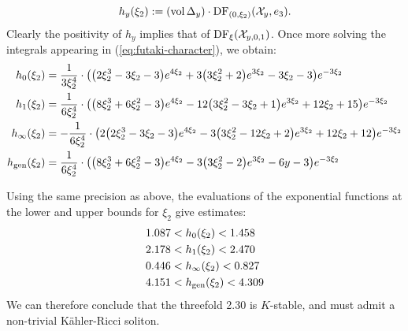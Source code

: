 \begin{example}
\[
h_y(\xi_2) := (\mathop{\rm vol}\nolimits \Delta_y) \cdot \mathop{\rm DF}\nolimits_{(0,\xi_2)}({\mathcal{X}}_{y},e_3).
\]
Clearly the positivity of \(h_y\) implies that of \(\mathop{\rm DF}\nolimits_\xi({\mathcal{X}}_{y,0,1})\). 
Once more solving the integrals appearing in (\ref{eq:futaki-character}), we obtain:
\begin{align*}
h_0(\xi_2) &= \frac{1}{3\xi_2^{4}}\cdot
{\left({\left(2   \xi_2^{3} - 3   \xi_2 - 3\right)} e^{4   \xi_2} + 3   {\left(3   \xi_2^{2} + 2\right)} e^{3   \xi_2} - 3   \xi_2 - 3\right)} e^{-3   \xi_2}
\\
h_1(\xi_2) &= \frac{1}{6   \xi_2^{4}}\cdot
{\left({\left(8   \xi_2^{3} + 6   \xi_2^{2} - 3\right)} e^{4   \xi_2} - 12   {\left(3   \xi_2^{2} - 3   \xi_2 + 1\right)} e^{3   \xi_2} + 12   \xi_2 + 15\right)} e^{-3   \xi_2} \\
h_\infty(\xi_2) &= -\frac{1}{6   \xi_2^{4}}\cdot
{\left(2   {\left(2   \xi_2^{3} - 3   \xi_2 - 3\right)} e^{4   \xi_2} - 3   {\left(3   \xi_2^{2} - 12   \xi_2 + 2\right)} e^{3   \xi_2} + 12   \xi_2 + 12\right)} e^{-3   \xi_2} \\
h_{\operatorname{gen}}(\xi_2) &= \frac{1}{6   \xi_2^{4}}\cdot{\left({\left(8   \xi_2^{3} + 6   \xi_2^{2} - 3\right)} e^{4   \xi_2 } - 3   {\left(3   \xi_2^{2} - 2\right)} e^{3   \xi_2} - 6   y - 3\right)} e^{-3   \xi_2} 
\end{align*}

Using the same precision as above, the  evaluations of the exponential functions at the lower and upper bounds for \(\xi_2\) give estimates:
\begin{align*}
1.087 &< h_0(\xi_2) < 1.458 \\
2.178 &< h_1(\xi_2) < 2.470\\
0.446 &< h_\infty(\xi_2) < 0.827 \\
4.151 &< h_{\operatorname{gen}}(\xi_2) < 4.309
\end{align*}
We can therefore conclude that the threefold 2.30 is \(K\)-stable, and must admit a non-trivial K\"ahler-Ricci soliton.
\end{example}
